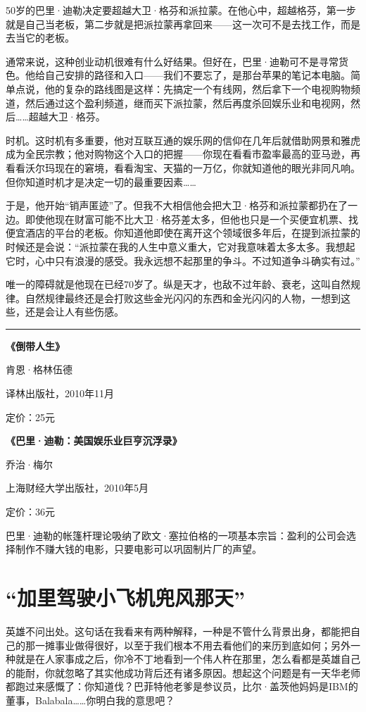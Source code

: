 50岁的巴里·迪勒决定要超越大卫·格芬和派拉蒙。在他心中，超越格芬，第一步就是自己当老板，第二步就是把派拉蒙再拿回来------这一次可不是去找工作，而是去当它的老板。

通常来说，这种创业动机很难有什么好结果。但好在，巴里·迪勒可不是寻常货色。他给自己安排的路径和入口------我们不要忘了，是那台苹果的笔记本电脑。简单点说，他的复杂的路线图是这样：先搞定一个有线网，然后拿下一个电视购物频道，然后通过这个盈利频道，继而买下派拉蒙，然后再度杀回娱乐业和电视网，然后\ldots{}\ldots{}超越大卫·格芬。

时机。这时机有多重要，他对互联互通的娱乐网的信仰在几年后就借助网景和雅虎成为全民宗教；他对购物这个入口的把握------你现在看看市盈率最高的亚马逊，再看看沃尔玛现在的窘境，看看淘宝、天猫的一万亿，你就知道他的眼光非同凡响。但你知道时机才是决定一切的最重要因素\ldots{}\ldots{}

于是，他开始``销声匿迹''了。但我不大相信他会把大卫·格芬和派拉蒙都扔在了一边。即使他现在财富可能不比大卫·格芬差太多，但他也只是一个买便宜机票、找便宜酒店的平台的老板。你知道他即使在离开这个领域很多年后，在提到派拉蒙的时候还是会说：``派拉蒙在我的人生中意义重大，它对我意味着太多太多。我想起它时，心中只有浪漫的感受。我永远想不起那里的争斗。不过知道争斗确实有过。''

唯一的障碍就是他现在已经70岁了。纵是天才，也敌不过年龄、衰老，这叫自然规律。自然规律最终还是会打败这些金光闪闪的东西和金光闪闪的人物，一想到这些，还是会让人有些伤感。

\begin{center}\rule{3in}{0.4pt}\end{center}

\textbf{《倒带人生》}

肯恩·格林伍德

译林出版社，2010年11月

定价：25元

\textbf{《巴里·迪勒：美国娱乐业巨亨沉浮录》}

乔治·梅尔

上海财经大学出版社，2010年5月

定价：36元

巴里·迪勒的帐篷杆理论吸纳了欧文·塞拉伯格的一项基本宗旨：盈利的公司会选择制作不赚大钱的电影，只要电影可以巩固制片厂的声望。

\section{``加里驾驶小飞机兜风那天''}

英雄不问出处。这句话在我看来有两种解释，一种是不管什么背景出身，都能把自己的那一摊事业做得很好，以至于我们根本不用去看他们的来历到底如何；另外一种就是在人家事成之后，你冷不丁地看到一个伟人杵在那里，怎么看都是英雄自己的能耐，你就忽略了其实他成功背后还有诸多原因。想起这个问题是有一天华老师都跑过来感慨了：你知道伐？巴菲特他老爹是参议员，比尔·盖茨他妈妈是IBM的董事，Balabala\ldots{}\ldots{}你明白我的意思吧？

